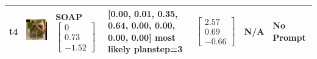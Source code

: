 \begin{longtable}{| V{0.8cm} | V{2.6cm} | V{1.6cm} | V{2.1cm} | V{1.55cm} | V{1.6cm} | V{3.2cm} |}
t4 &
\includegraphics[width=\linewidth]{fig/system/_fast2-soap_.jpg} &
SOAP
\linebreak\linebreak
$\begin{bmatrix}
0 \\
0.73 \\
-1.52
\end{bmatrix}$ &
[0.00, 0.01, 0.35, 0.64, 0.00, 0.00, 0.00, 0.00] most likely planstep=3 &
$\begin{bmatrix}
2.57 \\
0.69 \\
-0.66
\end{bmatrix}$ &
N/A &
No Prompt
\\ \hline



\end{longtable}
